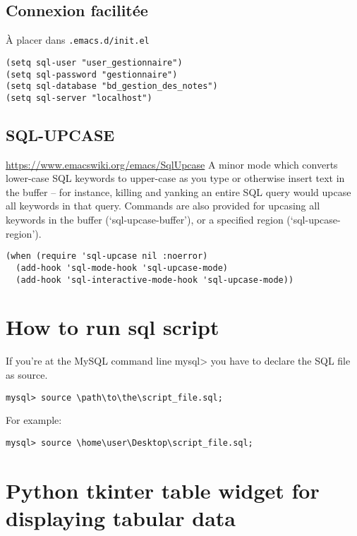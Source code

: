 \documentclass[11pt]{article}
\begin{document}
\subsection{Connexion facilitée}
\label{sec:org7d959de}
À placer dans \texttt{.emacs.d/init.el}
\begin{verbatim}
(setq sql-user "user_gestionnaire")
(setq sql-password "gestionnaire")
(setq sql-database "bd_gestion_des_notes")
(setq sql-server "localhost")
\end{verbatim}

\subsection{SQL-UPCASE}
\label{sec:orge61d8f6}
\url{https://www.emacswiki.org/emacs/SqlUpcase}
A minor mode which converts lower-case SQL keywords to upper-case as you type or otherwise insert text in the buffer – for instance, killing and yanking an entire SQL query would upcase all keywords in that query.
Commands are also provided for upcasing all keywords in the buffer (‘sql-upcase-buffer’), or a specified region (‘sql-upcase-region’).
\begin{verbatim}
(when (require 'sql-upcase nil :noerror)
  (add-hook 'sql-mode-hook 'sql-upcase-mode)
  (add-hook 'sql-interactive-mode-hook 'sql-upcase-mode))
\end{verbatim}


\section{How to run sql script}
\label{sec:org6f61d8a}

If you’re at the MySQL command line mysql> you have to declare the SQL file as source.

\begin{verbatim}
mysql> source \path\to\the\script_file.sql;
\end{verbatim}

For example:

\begin{verbatim}
mysql> source \home\user\Desktop\script_file.sql;
\end{verbatim}


\section{Python tkinter table widget for displaying tabular data}
\label{sec:orgfb8c314}
\end{document}
